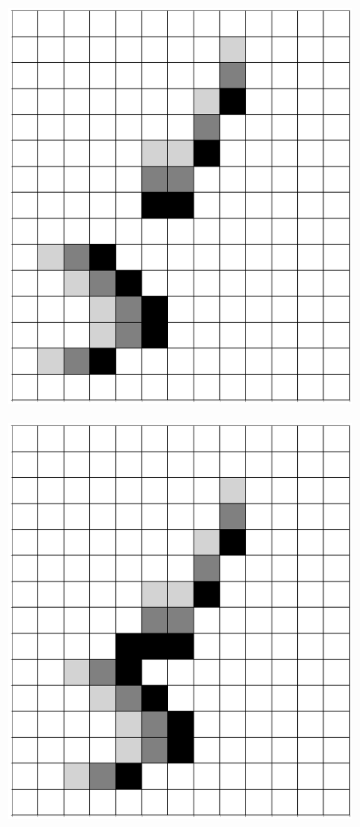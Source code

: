 \documentclass[12pt]{article}
\numberwithin{figure}{section} %
\begin{document}
\begin{figure}[H]
	\begin{subfigure}{0.23\textwidth}
     	\includegraphics[width=\linewidth]{Section4/36.0}
     	\subcaption{}
   	\end{subfigure}
    	\begin{subfigure}{0.23\textwidth}
     	\includegraphics[width=\linewidth]{Section4/36.1}

\end{subfigure}
\end{figure}
\end{document}
